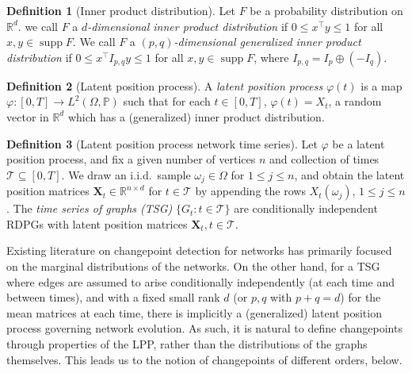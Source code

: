 \documentclass[12pt]{article}
\newcommand{\RR}{\mathbb{R}}
\newcommand{\EE}{\mathbb{E}}
\theoremstyle{definition}
\newtheorem{definition}{Definition}
\newcommand{\R}{\mathbb{R}}
\newcommand{\bX}{\mathbf{X}}
\newcommand{\supp}{\operatorname{supp}}
\begin{document}
\begin{definition}[Inner product distribution]
\label{def:innerprod}
Let $F$ be a probability distribution on $\R^d$. we call $F$ a \emph{$d$-dimensional inner product distribution}
if $0 \leq x^{\top} y \leq 1$ for all $x,y \in \supp F$. We call $F$ a \emph{$(p,q)$-dimensional generalized inner product distribution} if $0\leq x^\top I_{p,q} y \leq 1$ for all $x,y\in\supp F$, where $I_{p,q}=I_p\oplus (-I_q)$. 
\end{definition}

\begin{definition}[Latent position process]\label{def:latent_pos_proc}
A {\em latent position process} $\varphi(t)$ is a map $\varphi:[0,T]\rightarrow L^2(\Omega, \mathbb{P})$ such that for each $t\in [0,T]$, $\varphi(t)=X_t$, a random vector in $\R^d$ which has a (generalized) inner product distribution.
\end{definition}


\begin{definition}[Latent position process network time series]
\label{def:tsg}
Let $\varphi$ be a latent position process, and fix a given number of vertices $n$ and collection of times $\mathcal{T}\subseteq[0,T]$. We draw an i.i.d.\ sample $\omega_j\in \Omega$ for $1\leq j\leq n$, and obtain the latent position matrices $\bX_{t}\in\RR^{n\times d}$ for $t\in\mathcal{T}$ by appending the rows $X_t(\omega_j)$, $1\leq j\leq n$. The \emph{time series of graphs (TSG)} $\{G_t: t\in\mathcal{T}\}$ are conditionally independent RDPGs with latent position matrices $\bX_{t}, t\in\mathcal{T}$.
\end{definition}

Existing literature on changepoint detection for networks has primarily focused on the marginal distributions of the networks. On the other hand, for a TSG where edges are assumed to arise conditionally independently (at each time and between times), and with a fixed small rank $d$ (or $p,q$ with $p+q=d$) for the mean matrices at each time, there is implicitly a (generalized) latent position process governing network evolution. As such, it is natural to define changepoints through properties of the LPP, rather than the distributions of the graphs themselves. This leads us to the notion of changepoints of different orders, below.
\end{document}
